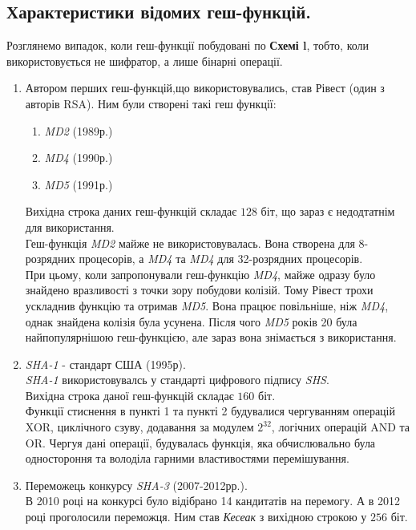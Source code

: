 \subsection*{Характеристики відомих геш-функцій.}
Розглянемо випадок, коли геш-функції побудовані по \textbf{Схемі l}, тобто, коли використовується не шифратор, а лише бінарні операції.
\begin{enumerate}
        \item Автором перших геш-функцій,що використовувались, став Рівест (один з авторів RSA). Ним були створені такі геш функції:
        \begin{enumerate}
                \item[] \textit{MD2} (1989р.)
                \item[] \textit{MD4} (1990р.)
                \item[] \textit{MD5} (1991р.)
        \end{enumerate}
        Вихідна строка даних геш-функцій складає $128$ біт, що зараз є недодтатнім для використання.\\
        Геш-функція \textit{MD2} майже не використовувалась. Вона створена для 8-розрядних процесорів, а \textit{MD4} та \textit{MD4} для 32-розрядних процесорів.\\
        При цьому, коли запропонували геш-функцію \textit{MD4}, майже одразу було знайдено вразливості з точки зору побудови колізій. Тому Рівест трохи ускладнив функцію та отримав \textit{MD5}. Вона працює повільніше, ніж \textit{MD4}, однак знайдена колізія була усунена. Після чого \textit{MD5} років 20 була найпопулярнішою геш-функцією, але зараз вона знімається з використання.
        \item \textit{SHA-1} - стандарт США (1995р).\\
        \textit{SHA-1} використовувалсь у стандарті цифрового підпису \textit{SHS}.\\
        Вихідна строка даної геш-функцій складає $160$ біт.\\
        Функції стиснення в пункті 1 та пункті 2 будувалися чергуванням операцій XOR, циклічного сзуву, додавання за модулем $2^{32}$, логічних операцій AND та OR. Чергуя дані операції, будувалась функція, яка обчислювально була одностороння та володіла гарними властивостями перемішування.
        \item Переможець конкурсу \textit{SHA-3} (2007-2012рр.).\\
        В 2010 році на конкурсі було відібрано 14 кандитатів на перемогу. А в 2012 році проголосили переможця. Ним став \textit{Кесеак} з вихідною строкою у $256$ біт.
\end{enumerate}
